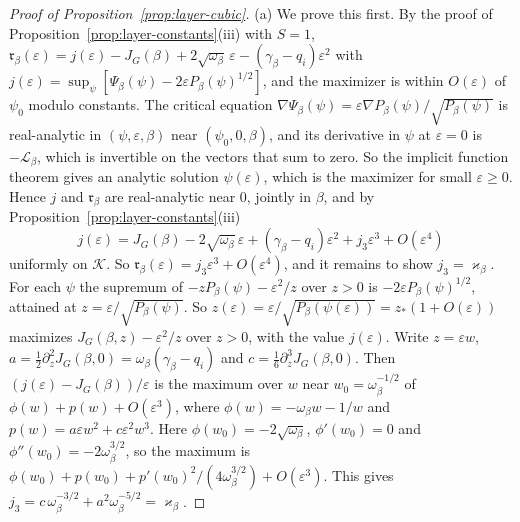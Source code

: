 \begin{proof}[Proof of Proposition~\ref{prop:layer-cubic}]
(a) We prove this first. By the proof of Proposition~\ref{prop:layer-constants}(iii) with $S=1$,
$\mathfrak r_\beta(\varepsilon)=j(\varepsilon)-J_G(\beta)+2\sqrt{\omega_\beta}\,\varepsilon-(\gamma_\beta-q_i)\varepsilon^2$
with $j(\varepsilon)=\sup_\psi[\Psi_\beta(\psi)-2\varepsilon P_\beta(\psi)^{1/2}]$, and the maximizer
is within $O(\varepsilon)$ of $\psi_0$ modulo constants. The critical equation
$\nabla\Psi_\beta(\psi)=\varepsilon\nabla P_\beta(\psi)/\sqrt{P_\beta(\psi)}$ is real-analytic in
$(\psi,\varepsilon,\beta)$ near $(\psi_0,0,\beta)$, and its derivative in $\psi$ at $\varepsilon=0$
is $-\mathcal L_\beta$, which is invertible on the vectors that sum to zero. So the implicit
function theorem gives an analytic solution $\psi(\varepsilon)$, which is the maximizer for small
$\varepsilon\ge0$. Hence $j$ and $\mathfrak r_\beta$ are real-analytic near $0$, jointly in $\beta$, and by
Proposition~\ref{prop:layer-constants}(iii)
\[
j(\varepsilon)=J_G(\beta)-2\sqrt{\omega_\beta}\,\varepsilon+(\gamma_\beta-q_i)\varepsilon^2+j_3\varepsilon^3+O(\varepsilon^4)
\]
uniformly on $\mathcal K$. So $\mathfrak r_\beta(\varepsilon)=j_3\varepsilon^3+O(\varepsilon^4)$, and it
remains to show $j_3=\varkappa_\beta$. For each $\psi$ the supremum of $-zP_\beta(\psi)-\varepsilon^2/z$
over $z>0$ is $-2\varepsilon P_\beta(\psi)^{1/2}$, attained at $z=\varepsilon/\sqrt{P_\beta(\psi)}$.
So $z(\varepsilon)=\varepsilon/\sqrt{P_\beta(\psi(\varepsilon))}=z_*(1+O(\varepsilon))$ maximizes
$J_G(\beta,z)-\varepsilon^2/z$ over $z>0$, with the value $j(\varepsilon)$. Write $z=\varepsilon w$,
$a=\frac12\partial_z^2J_G(\beta,0)=\omega_\beta(\gamma_\beta-q_i)$ and
$c=\frac16\partial_z^3J_G(\beta,0)$. Then $(j(\varepsilon)-J_G(\beta))/\varepsilon$ is the maximum
over $w$ near $w_0=\omega_\beta^{-1/2}$ of $\phi(w)+p(w)+O(\varepsilon^3)$, where
$\phi(w)=-\omega_\beta w-1/w$ and $p(w)=a\varepsilon w^2+c\varepsilon^2w^3$. Here
$\phi(w_0)=-2\sqrt{\omega_\beta}$, $\phi'(w_0)=0$ and $\phi''(w_0)=-2\omega_\beta^{3/2}$, so the
maximum is $\phi(w_0)+p(w_0)+p'(w_0)^2/(4\omega_\beta^{3/2})+O(\varepsilon^3)$. This gives
$j_3=c\,\omega_\beta^{-3/2}+a^2\omega_\beta^{-5/2}=\varkappa_\beta$.


\end{proof}
